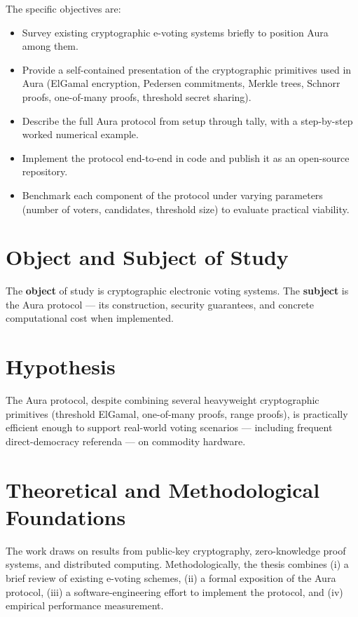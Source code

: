 \documentclass[12pt,a4paper,oneside]{report}
\begin{document}
The specific objectives are:
\begin{itemize}
    \item Survey existing cryptographic e-voting systems briefly to position 
    Aura among them.
    \item Provide a self-contained presentation of the cryptographic primitives 
    used in Aura (ElGamal encryption, Pedersen commitments, Merkle trees, 
    Schnorr proofs, one-of-many proofs, threshold secret sharing).
    \item Describe the full Aura protocol from setup through tally, with 
    a step-by-step worked numerical example.
    \item Implement the protocol end-to-end in code and publish it as 
    an open-source repository.
    \item Benchmark each component of the protocol under varying parameters 
    (number of voters, candidates, threshold size) to evaluate practical viability.
\end{itemize}

\section*{Object and Subject of Study}
The \textbf{object} of study is cryptographic electronic voting systems. 
The \textbf{subject} is the Aura protocol --- its construction, security 
guarantees, and concrete computational cost when implemented.

\section*{Hypothesis}
The Aura protocol, despite combining several heavyweight cryptographic 
primitives (threshold ElGamal, one-of-many proofs, range proofs), is 
practically efficient enough to support real-world voting scenarios --- 
including frequent direct-democracy referenda --- on commodity hardware.

\section*{Theoretical and Methodological Foundations}
The work draws on results from public-key cryptography, zero-knowledge 
proof systems, and distributed computing. Methodologically, the thesis 
combines (i) a brief review of existing e-voting schemes, (ii) a formal 
exposition of the Aura protocol, (iii) a software-engineering effort to 
implement the protocol, and (iv) empirical performance measurement.
\end{document}
